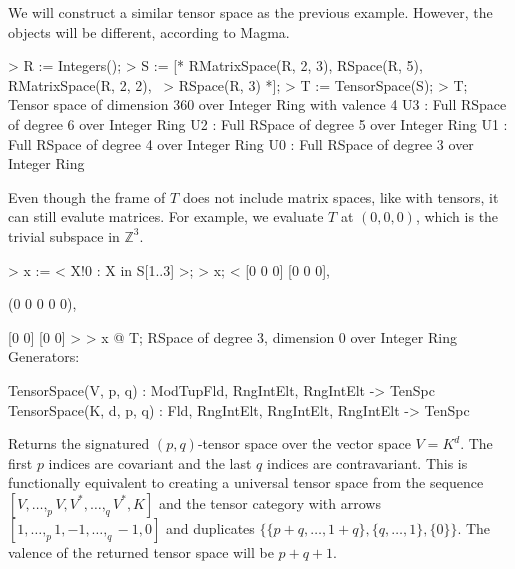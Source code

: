 \begin{example}[UniversalTenSpc]

We will construct a similar tensor space as the previous example. 
However, the objects will be different, according to Magma.
\begin{code}
> R := Integers();
> S := [* RMatrixSpace(R, 2, 3), RSpace(R, 5), RMatrixSpace(R, 2, 2), \
>     RSpace(R, 3) *];
> T := TensorSpace(S);
> T;
Tensor space of dimension 360 over Integer Ring with valence 4
U3 : Full RSpace of degree 6 over Integer Ring
U2 : Full RSpace of degree 5 over Integer Ring
U1 : Full RSpace of degree 4 over Integer Ring
U0 : Full RSpace of degree 3 over Integer Ring
\end{code}

Even though the frame of $T$ does not include matrix spaces, like with tensors, it can still evalute matrices. 
For example, we evaluate $T$ at $(0,0,0)$, which is the trivial subspace in $\mathbb{Z}^3$.
\begin{code}
> x := < X!0 : X in S[1..3] >;
> x;
<
    [0 0 0]
    [0 0 0],

    (0 0 0 0 0),

    [0 0]
    [0 0]
>
> x @ T;
RSpace of degree 3, dimension 0 over Integer Ring
Generators: 

\end{code}
\end{example}

\begin{intrinsics}
TensorSpace(V, p, q) : ModTupFld, RngIntElt, RngIntElt -> TenSpc
TensorSpace(K, d, p, q) : Fld, RngIntElt, RngIntElt, RngIntElt -> TenSpc
\end{intrinsics}

Returns the signatured $(p,q)$-tensor space over the vector space $V=K^d$. 
The first $p$ indices are covariant and the last $q$ indices are contravariant.  
This is functionally equivalent
to creating a universal tensor space from the sequence 
$[V,\dots,_p V, V^*,\dots,_q V^*, K]$
and the tensor category with arrows $[1,\dots,_p 1, -1,\dots,_q -1, 0]$ and 
duplicates $\{\{p+q,\dots,1+q\},\{q,\dots,1\},\{0\}\}$.
The valence of the returned tensor space will be $p+q+1$. 

